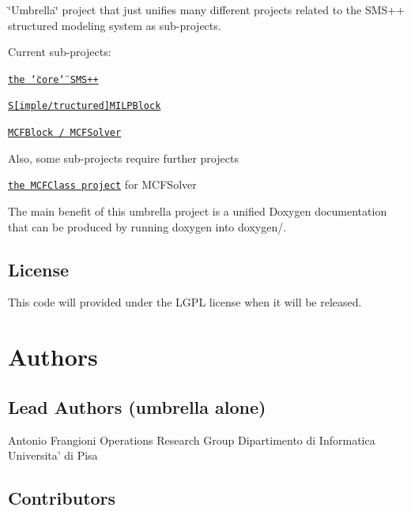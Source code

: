 \char`\"{}\+Umbrella\char`\"{} project that just unifies many different projects related to the S\+M\+S++ structured modeling system as sub-\/projects.

Current sub-\/projects\+:


\begin{DoxyItemize}
\item \href{https://gitlab.com/frangio68/sms_plus_plus}{\tt the \char`\"{}core\char`\"{} S\+M\+S++}
\item \href{https://gitlab.com/frangio68/sms_plus_plus_smilpblock}{\tt S\mbox{[}imple/tructured\mbox{]}M\+I\+L\+P\+Block}
\item \href{https://gitlab.com/frangio68/sms_plus_plus_mcfblock_mcfsolver}{\tt M\+C\+F\+Block / M\+C\+F\+Solver}
\end{DoxyItemize}

Also, some sub-\/projects require further projects


\begin{DoxyItemize}
\item \href{https://github.com/frangio68/Min-Cost-Flow-Class}{\tt the M\+C\+F\+Class project} for M\+C\+F\+Solver
\end{DoxyItemize}

The main benefit of this umbrella project is a unified Doxygen documentation that can be produced by running doxygen into doxygen/.

\subsection*{License }

This code will provided under the L\+G\+PL license when it will be released.

\section*{Authors }

\subsection*{Lead Authors (umbrella alone) }

\begin{DoxyVerb}Antonio Frangioni
Operations Research Group
Dipartimento di Informatica
Universita' di Pisa
\end{DoxyVerb}


\subsection*{Contributors }